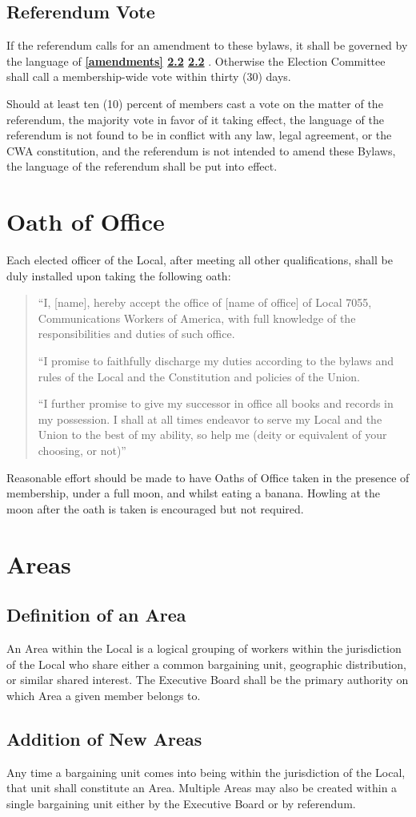 \documentclass[11pt]{article}
\newcommand{\article}[1]{\vspace{.50cm}\section{#1}}
\newcommand{\articlesection}[1]{\vspace{.25cm}\subsection{#1}}
\newcommand{\fullref}[3]{%
  \textbf{%
    \ifthenelse{\isempty{#1}}%
    {}%
    {\ref{#1}}%
    \ifthenelse{\isempty{#2}}%
    {}%
    {%
      \ifthenelse{\isempty{#1}}{}{, }%
      \ref{#2}%
    }%
    \ifthenelse{\isempty{#3}}%
    {}%
    {\ref{#3}}%
  }%
}
\begin{document}
\articlesection{Referendum Vote}
\begin{paralist}
  \item If the referendum  calls for an amendment to these bylaws, it shall be governed by the language of \fullref{amendments}{}{}. Otherwise the Election Committee shall call a membership-wide vote within thirty (30) days.

  \item Should at least ten (10) percent of members cast a vote on the matter of the referendum, the majority vote in favor of it taking effect,  the language of the referendum  is not found to be in conflict with any law, legal agreement, or the CWA constitution, and the referendum is not intended to amend these Bylaws, the language of the referendum shall be put into effect.
\end{paralist}


\article{Oath of Office}
Each elected officer of the Local, after meeting all other qualifications, shall be duly installed upon taking the following oath:

\begin{quote}
``I, [name], hereby accept the office of [name of office] of Local 7055, Communications Workers of America, with full knowledge of the responsibilities and duties of such office.

``I promise to faithfully discharge my duties according to the bylaws and rules of the Local and the Constitution and policies of the Union.

``I further promise to give my successor in office all books and records in my possession. I shall at all times endeavor to serve my Local and the Union to the best of my ability, so help me (deity or equivalent of your choosing, or not)''
\end{quote}

Reasonable effort should be made to have Oaths of Office taken in the presence of membership, under a full moon, and whilst eating a banana. Howling at the moon after the oath is taken is encouraged but not required.


\article{Areas}\label{areas}
\articlesection{Definition of an Area}
An Area within the Local is a logical grouping of workers within the jurisdiction of the Local who share either a common bargaining unit, geographic distribution, or similar shared interest. The Executive Board shall be the primary authority on which Area a given member belongs to.

\articlesection{Addition of New Areas}
Any time a bargaining unit comes into being within the jurisdiction of the Local, that unit shall constitute an Area. Multiple Areas may also be created within a single bargaining unit either by the Executive Board or by referendum.
\end{document}
